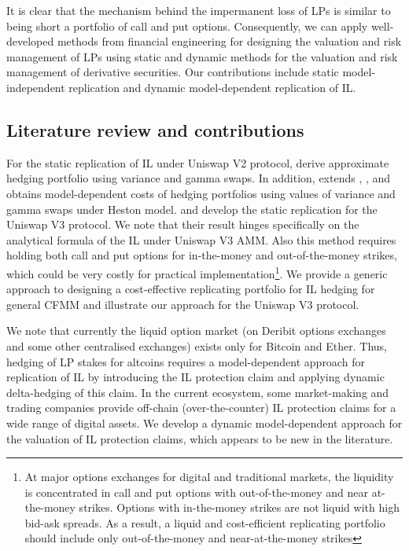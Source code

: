 \documentclass[pdftex,11pt,a4paper] {article}
\begin{document}
It is clear that the mechanism behind the impermanent loss of LPs is similar
to being short a portfolio of call and put options. Consequently, we can
apply well-developed methods from financial engineering for designing the
valuation and risk management of LPs using static and dynamic methods for
the valuation and risk management of derivative securities. Our contributions
include static model-independent replication and dynamic model-dependent
replication of IL.

\subsection{Literature review and contributions}

For the static replication of IL under Uniswap V2 protocol, %
\citet{Fukasawa2023} derive approximate hedging portfolio using variance and
gamma swaps. In addition, \citet{Lipton2024} extends \citet{LiptonSepp2008},
\citet{Lipton2018}, and obtains model-dependent costs
of hedging portfolios using values of variance and gamma swaps under Heston
model. \citet{Deng2023} and \citet{MaireWunsch2024} develop the static
replication for the Uniswap V3 protocol. We note that their result hinges
specifically on the analytical formula of the IL under Uniswap V3 AMM. Also
this method requires holding both call and put options for in-the-money and
out-of-the-money strikes, which could be very costly for practical
implementation\footnote{%
At major options exchanges for digital and traditional markets, the
liquidity is concentrated in call and put options with out-of-the-money and
near at-the-money strikes. Options with in-the-money strikes are not liquid
with high bid-ask spreads. As a result, a liquid and cost-efficient
replicating portfolio should include only out-of-the-money and near-at-the-money strikes}. We provide a generic approach to designing a cost-effective replicating portfolio for IL hedging for general CFMM and
illustrate our approach for the Uniswap V3 protocol.

We note that currently the liquid option market (on Deribit options
exchanges and some other centralised exchanges) exists only for Bitcoin and
Ether. Thus, hedging of LP stakes for altcoins requires a model-dependent
approach for replication of IL by introducing the IL protection claim and
applying dynamic delta-hedging of this claim. In the current ecosystem, some market-making and trading companies provide off-chain (over-the-counter)
IL protection claims for a wide range of digital assets. We develop a
dynamic model-dependent approach for the valuation of IL protection claims,
which appears to be new in the literature.
\end{document}
